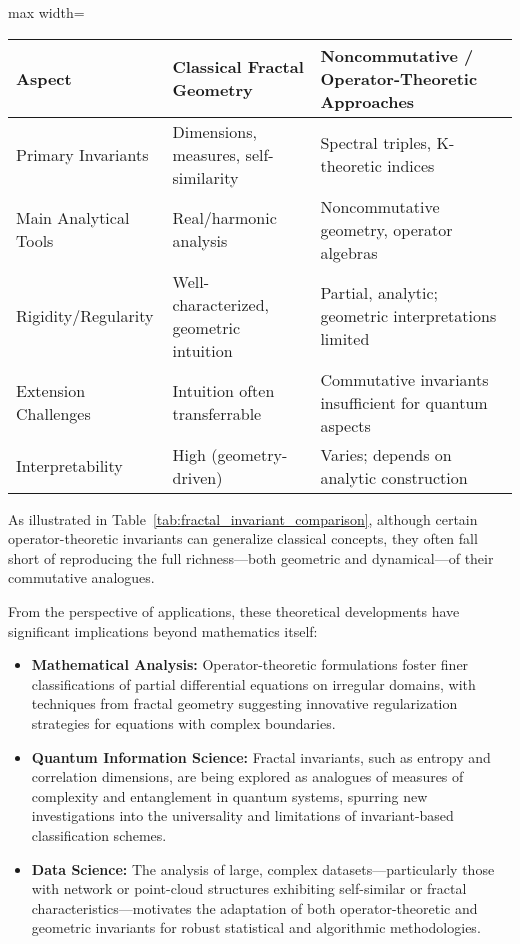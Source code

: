 \documentclass[sigconf]{acmart}
\begin{document}
\begin{table*}[htbp]
\centering
\caption{Comparison of Classical and Noncommutative Fractal Invariants}
\label{tab:fractal_invariant_comparison}
\begin{adjustbox}{max width=\textwidth}
\begin{tabular}{lll}
\toprule
\textbf{Aspect} & \textbf{Classical Fractal Geometry} & \textbf{Noncommutative / Operator-Theoretic Approaches} \\
\midrule
Primary Invariants & Dimensions, measures, self-similarity & Spectral triples, K-theoretic indices \\
Main Analytical Tools & Real/harmonic analysis & Noncommutative geometry, operator algebras \\
Rigidity/Regularity & Well-characterized, geometric intuition & Partial, analytic; geometric interpretations limited \\
Extension Challenges & Intuition often transferrable & Commutative invariants insufficient for quantum aspects \\
Interpretability & High (geometry-driven) & Varies; depends on analytic construction \\
\bottomrule
\end{tabular}
\end{adjustbox}
\end{table*}

As illustrated in Table~\ref{tab:fractal_invariant_comparison}, although certain operator-theoretic invariants can generalize classical concepts, they often fall short of reproducing the full richness—both geometric and dynamical—of their commutative analogues.

From the perspective of applications, these theoretical developments have significant implications beyond mathematics itself:

\begin{itemize}
    \item \textbf{Mathematical Analysis:} Operator-theoretic formulations foster finer classifications of partial differential equations on irregular domains, with techniques from fractal geometry suggesting innovative regularization strategies for equations with complex boundaries.
    \item \textbf{Quantum Information Science:} Fractal invariants, such as entropy and correlation dimensions, are being explored as analogues of measures of complexity and entanglement in quantum systems, spurring new investigations into the universality and limitations of invariant-based classification schemes.
    \item \textbf{Data Science:} The analysis of large, complex datasets—particularly those with network or point-cloud structures exhibiting self-similar or fractal characteristics—motivates the adaptation of both operator-theoretic and geometric invariants for robust statistical and algorithmic methodologies.
\end{itemize}
\end{document}

